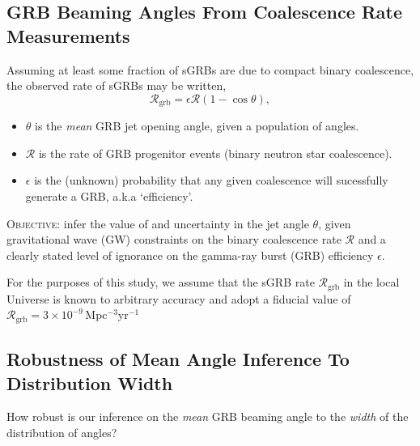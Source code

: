 \documentclass[a0,landscape]{a0poster}
\newcommand{\grbrate}{{{\mathcal R}_{\mathrm{grb}}}}
\newcommand{\cbcrate}{{{\mathcal R}}}
\def\gw#1{gravitational wave#1 (GW#1)\gdef\gw{GW}}
\def\grb#1{gamma-ray burst#1 (GRB#1)\gdef\grb{GRB}}
\begin{document}
\begin{multicols}{4}

\section*{\centering GRB Beaming Angles From Coalescence Rate Measurements}
Assuming at least some fraction of sGRBs are due to compact binary
coalescence, the observed rate of sGRBs may be written,
%
\begin{equation}\label{eq:rate2angle}
\grbrate=\epsilon\cbcrate(1-\cos \theta),
\end{equation}
%
\begin{itemize}
    \item $\theta$ is the \emph{mean} GRB jet opening angle, given a population
        of angles.%
    \item $\cbcrate$ is the rate of GRB progenitor events (binary
        neutron star coalescence).  
    \item $\epsilon$ is the (unknown) probability that any given coalescence will
        sucessfully generate a GRB, a.k.a `efficiency'.
\end{itemize}

{\large \textsc{Objective}}: infer the value of and uncertainty in the jet
angle $\theta$, given \gw{} constraints on the binary coalescence rate
$\cbcrate$ and a clearly stated level of ignorance on the \grb{} efficiency
$\epsilon$.

For the purposes of this study, we assume that the sGRB rate $\grbrate$ in the
local Universe is known to arbitrary accuracy and adopt a fiducial value of
$\grbrate = 3\times10^{-9}$\,Mpc$^{-3}$yr$^{-1}$


\subsection*{\centering Robustness of Mean Angle Inference To Distribution Width}

How robust is our inference on the \emph{mean} GRB beaming angle to the
\emph{width} of the distribution of angles?  


\end{multicols}
\end{document}

